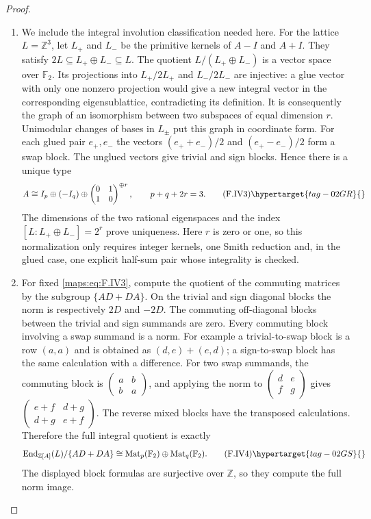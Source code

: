 \begin{proof}
\begin{enumerate}[label={$\langle1\rangle$\arabic*.}]
\item We include the integral involution classification needed here.
For the lattice $L=\mathbb Z^3$, let $L_+$ and $L_-$ be the
primitive kernels of $A-I$ and $A+I$.  They satisfy
$2L\subseteq L_+\oplus L_-\subseteq L$.
The quotient $L/(L_+\oplus L_-)$ is a vector space over
$\mathbb F_2$.  Its projections into $L_+/2L_+$ and
$L_-/2L_-$ are injective: a glue vector with only one
nonzero projection would give a new integral vector in the
corresponding eigensublattice, contradicting its definition.
It is consequently the graph of an isomorphism between two
subspaces of equal dimension $r$.
Unimodular changes of bases in $L_\pm$ put this graph in
coordinate form.  For each glued pair $e_+,e_-$ the vectors
$(e_++e_-)/2$ and $(e_+-e_-)/2$ form a swap block.
The unglued vectors give trivial and sign blocks.  Hence
there is a unique type
\[
 A\cong I_p\oplus(-I_q)\oplus
 \begin{pmatrix}0&1\\1&0\end{pmatrix}^{\oplus r},
 \qquad p+q+2r=3.                                         \tag{F.IV3}\hypertarget{tag-02GR}{}\label{maps:eq:F.IV3}
\]
The dimensions of the two rational eigenspaces and the
index $[L:L_+\oplus L_-]=2^r$ prove uniqueness.
Here $r$ is zero or one, so this normalization only requires
integer kernels, one Smith reduction and, in the glued case,
one explicit half-sum pair whose integrality is checked.

\item For fixed \eqref{maps:eq:F.IV3}, compute the quotient of the commuting
matrices by the subgroup $\{AD+DA\}$.
On the trivial and sign diagonal blocks the norm is
respectively $2D$ and $-2D$.  The commuting off-diagonal
blocks between the trivial and sign summands are zero.
Every commuting block involving a swap summand is a norm.
For example a trivial-to-swap block is a row $(a,a)$ and
is obtained as $(d,e)+(e,d)$; a sign-to-swap block has the
same calculation with a difference.  For two swap summands,
the commuting block is
$\begin{pmatrix}a&b\\b&a\end{pmatrix}$, and applying the
norm to $\begin{pmatrix}d&e\\f&g\end{pmatrix}$ gives
$\begin{pmatrix}e+f&d+g\\d+g&e+f\end{pmatrix}$.
The reverse mixed blocks have the transposed calculations.
Therefore the full integral quotient is exactly
\[
 \operatorname{End}_{\mathbb Z[A]}(L)/\{AD+DA\}
 \cong \operatorname{Mat}_p(\mathbb F_2)
       \oplus\operatorname{Mat}_q(\mathbb F_2).             \tag{F.IV4}\hypertarget{tag-02GS}{}\label{maps:eq:F.IV4}
\]
The displayed block formulas are surjective over $\mathbb Z$, so
they compute the full norm image.


\end{enumerate}
\end{proof}
